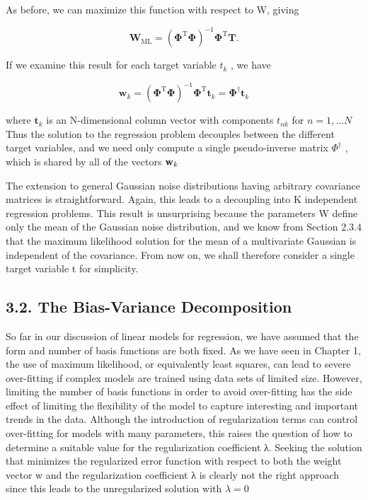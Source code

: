 \documentclass[
  10
]{article}
\begin{document}
As before, we can maximize this function with respect to W, giving

\[
\mathbf {W} _ {\mathrm{ML}} = \left(\boldsymbol {\Phi} ^ {\mathrm{T}} \boldsymbol {\Phi}\right) ^ {- 1} \boldsymbol {\Phi} ^ {\mathrm{T}} \mathbf {T}.\tag{3.34}
\]

If we examine this result for each target variable \(t _ { k }\) , we
have

\[
\mathbf {w} _ {k} = \left(\boldsymbol {\Phi} ^ {\mathrm{T}} \boldsymbol {\Phi}\right) ^ {- 1} \boldsymbol {\Phi} ^ {\mathrm{T}} \mathbf {t} _ {k} = \boldsymbol {\Phi} ^ {\dagger} \mathbf {t} _ {k}\tag{3.35}
\]

where \(\mathbf { t } _ { k }\) is an N-dimensional column vector with
components \(t _ { n k }\) for \(n = 1 , \ldots N\) Thus the solution to
the regression problem decouples between the different target variables,
and we need only compute a single pseudo-inverse matrix
\(\Phi ^ { \dag }\) , which is shared by all of the vectors
\({ \bf w } _ { k }\)

The extension to general Gaussian noise distributions having arbitrary
covariance matrices is straightforward. Again, this leads to a
decoupling into K independent regression problems. This result is
unsurprising because the parameters W define only the mean of the
Gaussian noise distribution, and we know from Section 2.3.4 that the
maximum likelihood solution for the mean of a multivariate Gaussian is
independent of the covariance. From now on, we shall therefore consider
a single target variable t for simplicity.

\subsection{3.2. The Bias-Variance
Decomposition}\label{the-bias-variance-decomposition}

So far in our discussion of linear models for regression, we have
assumed that the form and number of basis functions are both fixed. As
we have seen in Chapter 1, the use of maximum likelihood, or
equivalently least squares, can lead to severe over-fitting if complex
models are trained using data sets of limited size. However, limiting
the number of basis functions in order to avoid over-fitting has the
side effect of limiting the flexibility of the model to capture
interesting and important trends in the data. Although the introduction
of regularization terms can control over-fitting for models with many
parameters, this raises the question of how to determine a suitable
value for the regularization coefficient λ. Seeking the solution that
minimizes the regularized error function with respect to both the weight
vector w and the regularization coefficient λ is clearly not the right
approach since this leads to the unregularized solution with
\(\lambda = 0\)
\end{document}
